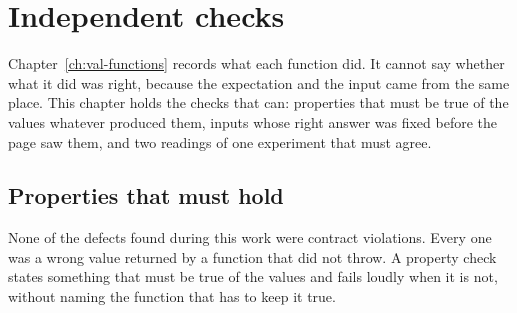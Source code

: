 \chapter{Independent checks}\label{ch:val-oracles}

Chapter~\ref{ch:val-functions} records what each function did. It cannot say
whether what it did was right, because the expectation and the input came from the
same place. This chapter holds the checks that can: properties that must be true
of the values whatever produced them, inputs whose right answer was fixed before
the page saw them, and two readings of one experiment that must agree.

\section{Properties that must hold}
None of the defects found during this work were contract violations. Every one was
a wrong value returned by a function that did not throw. A property check states
something that must be true of the values and fails loudly when it is not, without
naming the function that has to keep it true.

